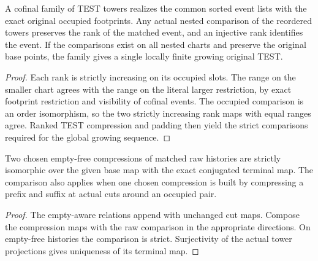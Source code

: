 \begin{theorem}
\label{hir:g8-global-matched-rank-reorderings}
\leanok
A cofinal family of TEST towers realizes the common sorted event lists
with the exact original occupied footprints. Any actual nested
comparison of the reordered towers preserves the rank of the matched
event, and an injective rank identifies the event. If the comparisons
exist on all nested charts and preserve the original base points, the
family gives a single locally finite growing original TEST.
\end{theorem}
\begin{proof}
Each rank is strictly increasing on its occupied slots. The range on
the smaller chart agrees with the range on the literal larger
restriction, by exact footprint restriction and visibility of
cofinal events. The occupied comparison is an order isomorphism, so
the two strictly increasing rank maps with equal ranges agree.
Ranked TEST compression and padding then yield the strict
comparisons required for the global growing sequence.
\end{proof}

\begin{proposition}
\label{hir:g8-exact-compression-cuts}
\leanok
Two chosen empty-free compressions of matched raw histories are
strictly isomorphic over the given base map with the exact conjugated
terminal map. The comparison also applies when one chosen compression
is built by compressing a prefix and suffix at actual cuts around
an occupied pair.
\end{proposition}
\begin{proof}
The empty-aware relations append with unchanged cut maps. Compose
the compression maps with the raw comparison in the appropriate
directions. On empty-free histories the comparison is strict.
Surjectivity of the actual tower projections gives uniqueness of
its terminal map.
\end{proof}

